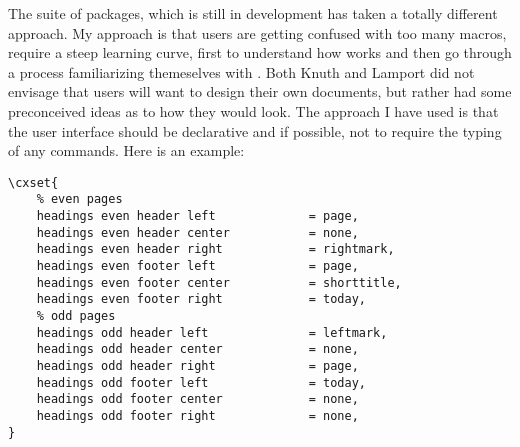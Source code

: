 The  suite of packages, which is still in development has taken a totally different approach. My approach is that users are getting confused with too many macros, require a steep learning curve, first to understand how \tex works and then go through a process familiarizing themeselves with \latexe. Both Knuth and Lamport did not envisage that users will want to design their own documents, but rather had some preconceived ideas as to how they would look. The approach I have used is that the user interface should be declarative and if possible, not to require the typing of any commands. Here is an example:

\begin{verbatim}
\cxset{
    % even pages
    headings even header left             = page,
    headings even header center           = none,
    headings even header right            = rightmark, 
    headings even footer left             = page,
    headings even footer center           = shorttitle,
    headings even footer right            = today,
    % odd pages
    headings odd header left              = leftmark,
    headings odd header center            = none,
    headings odd header right             = page, 
    headings odd footer left              = today,
    headings odd footer center            = none,
    headings odd footer right             = none, 
}
\end{verbatim}


